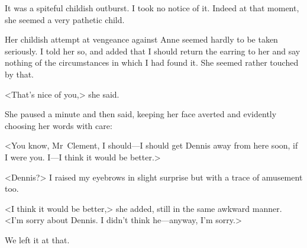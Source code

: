 It was a spiteful childish outburst. I took no notice of it. Indeed at that moment, she seemed a very pathetic child.

Her childish attempt at vengeance against Anne seemed hardly to be taken seriously. I told her so, and added that I should return the earring to her and say nothing of the circumstances in which I had found it. She seemed rather touched by that.

<That's nice of you,> she said.

She paused a minute and then said, keeping her face averted and evidently choosing her words with care:

<You know, Mr~Clement, I should—I should get Dennis away from here soon, if I were you. I—I think it would be better.>

<Dennis?> I raised my eyebrows in slight surprise but with a trace of amusement too.

<I think it would be better,> she added, still in the same awkward manner. <I'm sorry about Dennis. I didn't think he—anyway, I'm sorry.>

We left it at that.